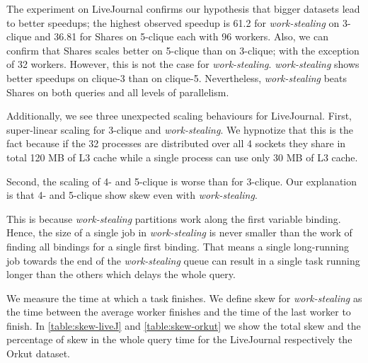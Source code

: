 
The experiment on LiveJournal confirms our hypothesis that bigger datasets lead to better
speedups;
the highest observed speedup is 61.2 for \textit{work-stealing} on 3-clique and
36.81 for Shares on 5-clique each with 96 workers.
Also, we can confirm that Shares scales better on 5-clique than on 3-clique; with the exception of 32 workers.
However, this is not the case for \textit{work-stealing}.
\textit{work-stealing} shows better speedups on clique-3 than on clique-5.
Nevertheless, \textit{work-stealing} beats Shares on both queries and all levels of parallelism.

Additionally, we see three unexpected scaling behaviours for LiveJournal.
First, super-linear scaling for 3-clique and \textit{work-stealing}.
We hypnotize that this is the fact because if the 32 processes are distributed over all 4 sockets they share in total
120 MB of L3 cache while a single process can use only 30 MB of L3 cache.

Second, the scaling of 4- and 5-clique is worse than for 3-clique.
Our explanation is that 4- and 5-clique show skew even with \textit{work-stealing}.

This is because \textit{work-stealing} partitions work along the first variable binding.
Hence, the size of a single job in \textit{work-stealing} is never smaller than the work of finding all bindings for a single
first binding.
That means a single long-running job towards the end of the \textit{work-stealing} queue can
result in a single task running longer than the others which delays the whole query.

We measure the time at which a task finishes.
We define skew for \textit{work-stealing} as the time between the average worker finishes and
the time of the last worker to finish.
In \cref{table:skew-liveJ} and \cref{table:skew-orkut} we show the total skew and the percentage of
skew in the whole query time for the LiveJournal respectively the Orkut dataset.

